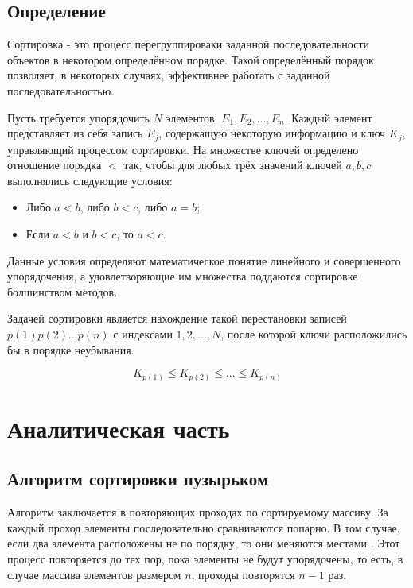 \documentclass[12pt]{report}
\begin{document}
\section*{Определение}
Сортировка - это процесс перегруппироваки заданной последовательности объектов в некотором определённом порядке. Такой определённый порядок позволяет, в некоторых случаях, эффективнее работать с заданной последовательностью.

Пусть требуется упорядочить $N$ элементов: $E_1,E_2,...,E_n$. Каждый элемент представляет из себя запись $E_j$, содержащую некоторую информацию и ключ $K_j$, управляющий процессом сортировки. На множестве ключей определено отношение порядка $<$ так, чтобы для любых трёх значений ключей $a,b,c$ выполнялись следующие условия:

\begin{itemize}
\item Либо $a < b$, либо $b < c$, либо $a = b$;
\item Если $a < b$ и $b < c$, то $a < c$.
\end{itemize}

Данные условия определяют математическое понятие линейного и совершенного упорядочения, а удовлетворяющие им множества поддаются сортировке болшинством методов.

Задачей сортировки является нахождение такой перестановки записей $p(1)p(2)...p(n)$ с индексами ${1, 2, ..., N}$, после которой ключи расположились бы в порядке неубывания.

\begin{equation}
K_{p(1)} \leq K_{p(2)} \leq ... \leq K_{p(n)}
\end{equation}

\chapter{Аналитическая часть}

\section{Алгоритм сортировки пузырьком}
Алгоритм заключается в повторяющих проходах по сортируемому массиву. За каждый проход элементы последовательно сравниваются попарно. В том случае, если два элемента расположены не по порядку, то они меняются местами \cite{Knut}. Этот процесс повторяется до тех пор, пока элементы не будут упорядочены, то есть, в случае массива элементов размером $n$, проходы повторятся $n - 1$ раз.
\end{document}
